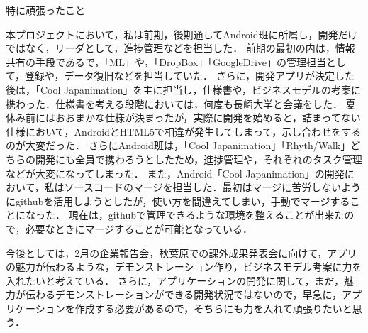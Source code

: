 \par
特に頑張ったこと
\par
\par
本プロジェクトにおいて，私は前期，後期通してAndroid班に所属し，開発だけではなく，リーダとして，進捗管理などを担当した．
前期の最初の内は，情報共有の手段であるで，「ML」や，「DropBox」「GoogleDrive」の管理担当として，登録や，データ復旧などを担当していた．
さらに，開発アプリが決定した後は，「Cool Japanimation」を主に担当し，仕様書や，ビジネスモデルの考案に携わった．仕様書を考える段階においては，何度も長崎大学と会議をした．
夏休み前にはおおまかな仕様が決まったが，実際に開発を始めると，詰まってない仕様において，AndroidとHTML5で相違が発生してしまって，示し合わせをするのが大変だった．
さらにAndroid班は，「Cool Japanimation」「Rhyth/Walk」どちらの開発にも全員で携わろうとしたため，進捗管理や，それぞれのタスク管理などが大変になってしまった．
また，Android「Cool Japanimation」の開発において，私はソースコードのマージを担当した．最初はマージに苦労しないようにgithubを活用しようとしたが，使い方を間違えてしまい，手動でマージすることになった．
現在は，githubで管理できるような環境を整えることが出来たので，必要なときにマージすることが可能となっている．
\par
今後としては，2月の企業報告会，秋葉原での課外成果発表会に向けて，アプリの魅力が伝わるような，デモンストレーション作り，ビジネスモデル考案に力を入れたいと考えている．
さらに，アプリケーションの開発に関して，まだ，魅力が伝わるデモンストレーションができる開発状況ではないので，早急に，アプリケーションを作成する必要があるので，そちらにも力を入れて頑張りたいと思う．
